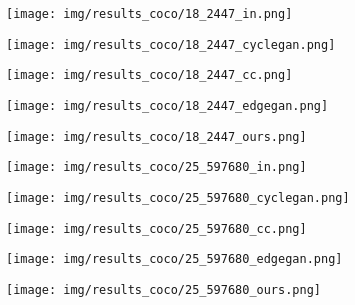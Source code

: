 \documentclass[10pt,twocolumn,letterpaper]{article}
\begin{document}
\begin{figure}[tbp]
\begin{center}
\begin{subfigure}[b]{\cocowidth\linewidth}
  \texttt{[image: img/results\_coco/18\_2447\_in.png]}
  \end{subfigure}
  \begin{subfigure}[b]{\cocowidth\linewidth}
  \texttt{[image: img/results\_coco/18\_2447\_cyclegan.png]}
  \end{subfigure}
  \begin{subfigure}[b]{\cocowidth\linewidth}
  \texttt{[image: img/results\_coco/18\_2447\_cc.png]}
  \end{subfigure}
   \begin{subfigure}[b]{\cocowidth\linewidth}
  \texttt{[image: img/results\_coco/18\_2447\_edgegan.png]}
  \end{subfigure}
  \begin{subfigure}[b]{\cocowidth\linewidth}
  \texttt{[image: img/results\_coco/18\_2447\_ours.png]}
  \end{subfigure}
\begin{subfigure}[b]{\cocowidth\linewidth}
  \texttt{[image: img/results\_coco/25\_597680\_in.png]}
  \end{subfigure}
  \begin{subfigure}[b]{\cocowidth\linewidth}
  \texttt{[image: img/results\_coco/25\_597680\_cyclegan.png]}
  \end{subfigure}
  \begin{subfigure}[b]{\cocowidth\linewidth}
  \texttt{[image: img/results\_coco/25\_597680\_cc.png]}
  \end{subfigure}
   \begin{subfigure}[b]{\cocowidth\linewidth}
  \texttt{[image: img/results\_coco/25\_597680\_edgegan.png]}
  \end{subfigure}
  \begin{subfigure}[b]{\cocowidth\linewidth}
  \texttt{[image: img/results\_coco/25\_597680\_ours.png]}
  \end{subfigure}
  

\end{center}
\end{figure}
\end{document}
